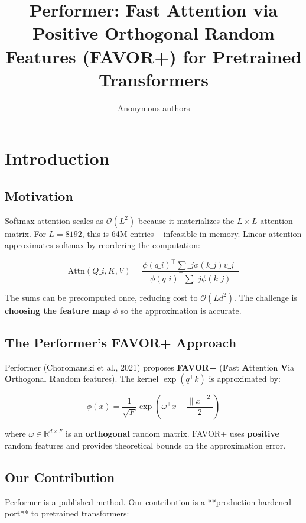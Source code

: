 \title{\textbf{Performer: Fast Attention via Positive Orthogonal Random Features (FAVOR+) for Pretrained Transformers}}

\author{Anonymous authors}



\section{Introduction}

\subsection{Motivation}

Softmax attention scales as $\mathcal{O}(L^2)$ because it materializes the 
$L \times L$ attention matrix. For $L = 8192$, this is 64M entries -- 
infeasible in memory. Linear attention approximates softmax by reordering 
the computation:

\[
\text{Attn}(Q\_i, K, V) = \frac{\phi(q\_i)^\top \sum\_j \phi(k\_j) v\_j^\top}{\phi(q\_i)^\top \sum\_j \phi(k\_j)}
\tag{1.1}
\]

The sums can be precomputed once, reducing cost to $\mathcal{O}(L d^2)$. The 
challenge is \textbf{choosing the feature map $\phi$} so the approximation is 
accurate.

\subsection{The Performer's FAVOR+ Approach}

Performer (Choromanski et al., 2021) proposes \textbf{FAVOR+} (\textbf{F}ast 
\textbf{A}ttention \textbf{V}ia \textbf{O}rthogonal \textbf{R}andom features). The kernel 
$\exp(q^\top k)$ is approximated by:

\[
\phi(x) = \frac{1}{\sqrt{F}} \exp\!\left(\omega^\top x - \frac{\|x\|^2}{2}\right)
\tag{1.2}
\]

where $\omega \in \mathbb{R}^{d \times F}$ is an \textbf{orthogonal} random 
matrix. FAVOR+ uses \textbf{positive} random features and provides theoretical 
bounds on the approximation error.

\subsection{Our Contribution}

Performer is a published method. Our contribution is a **production-hardened 
port** to pretrained transformers:


